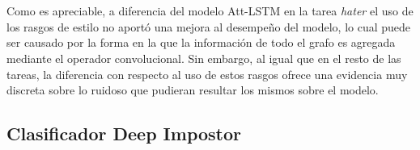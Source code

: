 	\\\\
	Como es apreciable, a diferencia del modelo Att-LSTM en la tarea \textit{hater} el uso de los rasgos de estilo no aportó una mejora al desempeño del modelo, lo cual puede ser causado por la forma en la que la información de todo el grafo es agregada mediante el operador convolucional. Sin embargo, al igual que en el resto de las tareas, la diferencia con respecto al uso de estos rasgos ofrece una evidencia muy discreta sobre lo ruidoso que pudieran resultar los mismos sobre el modelo.
	
	\subsection{ Clasificador Deep Impostor } 	
	

